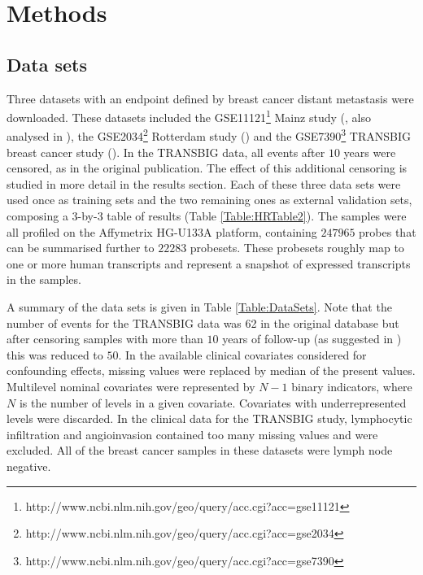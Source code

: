\documentclass[letterpaper,12pt]{article}
\begin{document}
\section{Methods}
\subsection{Data sets}
Three datasets with an endpoint defined by breast cancer distant metastasis were downloaded. These datasets included the GSE11121\footnote{http://www.ncbi.nlm.nih.gov/geo/query/acc.cgi?acc=gse11121} Mainz study (\citet{Schmidt:08}, also analysed in \citet{Kammers:11}), the GSE2034\footnote{http://www.ncbi.nlm.nih.gov/geo/query/acc.cgi?acc=gse2034} Rotterdam study (\citet{Wang:05}) and the GSE7390\footnote{http://www.ncbi.nlm.nih.gov/geo/query/acc.cgi?acc=gse7390} TRANSBIG breast cancer study (\citet{Desmedt:07}). In the TRANSBIG data, all events after $10$ years were censored, as in the original publication. The effect of this additional censoring is studied in more detail in the results section. Each of these three data sets were used once as training sets and the two remaining ones as external validation sets, composing a 3-by-3 table of results (Table \ref{Table:HRTable2}). The samples were all profiled on the Affymetrix HG-U133A platform, containing $247965$ probes that can be summarised further to $22283$ probesets. These probesets roughly map to one or more human transcripts and represent a snapshot of expressed transcripts in the samples.

A summary of the data sets is given in Table \ref{Table:DataSets}. Note that the number of events for the TRANSBIG data was 62 in the original database but after censoring samples with more than $10$ years of follow-up (as suggested in \citet{Desmedt:07}) this was reduced to $50$. In the available clinical covariates considered for confounding effects, missing values were replaced by median of the present values. Multilevel nominal covariates were represented by $N-1$ binary indicators, where $N$ is the number of levels in a given covariate. Covariates with underrepresented levels were discarded. In the clinical data for the TRANSBIG study, lymphocytic infiltration and angioinvasion contained too many missing values and were excluded. All of the breast cancer samples in these datasets were lymph node negative.
\end{document}
